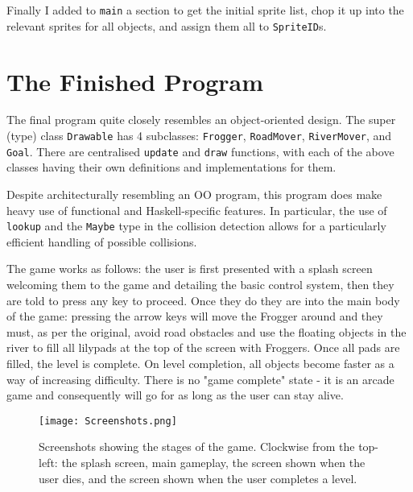 \documentclass[12pt, a4paper]{report}
\begin{document}
\par

Finally I added to \verb|main| a section to get the initial sprite list, chop it up into the relevant sprites for all objects, and assign them all to \verb|SpriteID|s.

\section{The Finished Program}

The final program quite closely resembles an object-oriented design.
The super (type) class \verb|Drawable| has 4 subclasses: \verb|Frogger|, \verb|RoadMover|, \verb|RiverMover|, and \verb|Goal|.
There are centralised \verb|update| and \verb|draw| functions, with each of the above classes having their own definitions and implementations for them.

\par

Despite architecturally resembling an OO program, this program does make heavy use of functional and Haskell-specific features.
In particular, the use of \verb|lookup| and the \verb|Maybe| type in the collision detection allows for a particularly efficient handling of possible collisions.

\par

The game works as follows: the user is first presented with a splash screen welcoming them to the game and detailing the basic control system, then they are told to press any key to proceed.
Once they do they are into the main body of the game: pressing the arrow keys will move the Frogger around and they must, as per the original, avoid road obstacles and use the floating objects in the river to fill all lilypads at the top of the screen with Froggers.
Once all pads are filled, the level is complete.
On level completion, all objects become faster as a way of increasing difficulty.
There is no "game complete" state - it is an arcade game and consequently will go for as long as the user can stay alive.

\begin{figure}[ht]
  \centering
  \caption{Screenshots showing the stages of the game. Clockwise from the top-left: the splash screen, main gameplay, the screen shown when the user dies, and the screen shown when the user completes a level.}
  \texttt{[image: Screenshots.png]}
  \label{fig:boxes}
\end{figure}
\end{document}
